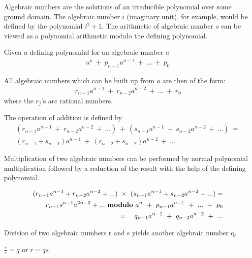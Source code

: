 

Algebraic numbers are the solutions of an irreducible polynomial over
some ground domain.   The algebraic number $i$ (imaginary
unit),  for example, would be defined by the
polynomial $i^2 + 1$.  The arithmetic of algebraic number $s$ can be
viewed as a polynomial arithmetic modulo the defining polynomial.

Given a defining polynomial for an algebraic number $a$
\begin{eqnarray*}
a^n ~ + ~ {p _{n-1}} {a ^ {n -1}} ~ + ~ ... ~ + ~ {p_0}
\end{eqnarray*}

All algebraic numbers which can be built up from $a$ are then of the form:
\begin{eqnarray*}
{r_{n-1}} {a ^{n-1}} ~+~ {r_{n-2}} {a ^{n-2}} ~+~ ... ~+~ {r_0}
\end{eqnarray*}
where the $r_j$'s are rational numbers.

The operation of addition is defined by
\begin{eqnarray*}
({r_{n-1}} {a ^{n-1}} ~+~ {r_{n-2}} {a ^{n-2}} ~+~ ...) ~ + ~
({s_{n-1}} {a ^{n-1}} ~+~ {s_{n-2}} {a ^{n-2}} ~+~ ...) ~ =  \\
({r_{n-1}+s_{n-1}}) {a ^{n-1}} ~+~ ({r_{n-2}+s_{n-2}}) {a ^{n-2}} ~+~ ...
\end{eqnarray*}

Multiplication of two algebraic numbers can be performed by normal
polynomial multiplication followed by a reduction of the result with the
help of the defining polynomial.

\begin{eqnarray*}
({r_{n-1}} {a ^{n-1}} + {r_{n-2}} {a ^{n-2}} + ...) ~ \times ~
({s_{n-1}} {a ^{n-1}} + {s_{n-2}} {a ^{n-2}} + ...) = \\
 {r_{n-1}} {s ^{n-1}}{a^{2n-2}} +  ... ~ {\bf modulo} ~
a^n ~ + ~ {p _{n-1}} {a ^ {n -1}} ~ + ~ ... ~ + ~ {p_0} \\
= ~~~{q_{n-1}} a^{n-1} ~ + ~ {q _{n-2}} {a ^ {n -2}} ~ + ~ ...
\end{eqnarray*}

Division of two algebraic numbers r and s yields another algebraic number q.

$ \frac{r}{s} = q$ or $ r = q s $.

